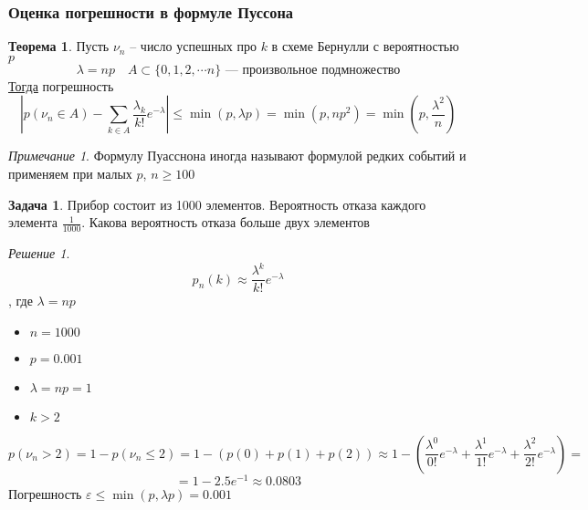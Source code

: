 \documentclass[english]{article}
\theoremstyle{plain}
\theoremstyle{remark}
\newtheorem*{remark}{Примечание}
\newtheorem*{solution}{Решение}
\theoremstyle{definition}
\newtheorem{task}{Задача}
\newtheorem{theorem}{Теорема}[section]
\begin{document}
\subsubsection{Оценка погрешности в формуле Пуссона}
\label{sec:org341aa8b}
\begin{theorem}
Пусть \(\nu_n\) -- число успешных про \(k\) в схеме Бернулли с вероятностью \(p\)
\[ \lambda = np\quad A \subset \{0, 1, 2, \dotsm n\}\text{ --- произвольное подмножество}\]
\uline{Тогда} погрешность
\[ \left|p(\nu_n \in A) - \sum_{k \in A} \frac{\lambda_k}{k!} e^{-\lambda}\right| \le \min(p, \lambda p) = \min(p, np^2) = \min\left(p, \frac{\lambda^2}{n}\right) \]
\end{theorem}
\begin{remark}
Формулу Пуасснона иногда называют формулой редких событий и применяем при малых \(p\), \(n \ge 100\)
\end{remark}
\begin{task}
Прибор состоит из 1000 элементов. Вероятность отказа каждого элемента \(\frac{1}{1000}\). Какова вероятность отказа больше двух элементов
\end{task}
\begin{solution}
\[ p_n(k) \approx \frac{\lambda^k}{k!}e^{-\lambda} \]
, где \(\lambda = np\)
\begin{itemize}
\item \(n = 1000\)
\item \(p = 0.001\)
\item \(\lambda = np = 1\)
\item \(k > 2\)
\end{itemize}
\[ p(\nu_n > 2) = 1 - p(\nu_n \le 2) = 1 - (p(0) + p(1) + p(2)) \approx 1 - \left(\frac{\lambda^0}{0!} e^{-\lambda} + \frac{\lambda^1}{1!}e^{-\lambda} + \frac{\lambda^2}{2!}e^{-\lambda}\right) = \]
\[ = 1 - 2.5e^{-1} \approx 0.0803\]
Погрешность \(\varepsilon \le \min(p, \lambda p) = 0.001\)
\end{solution}
\end{document}
